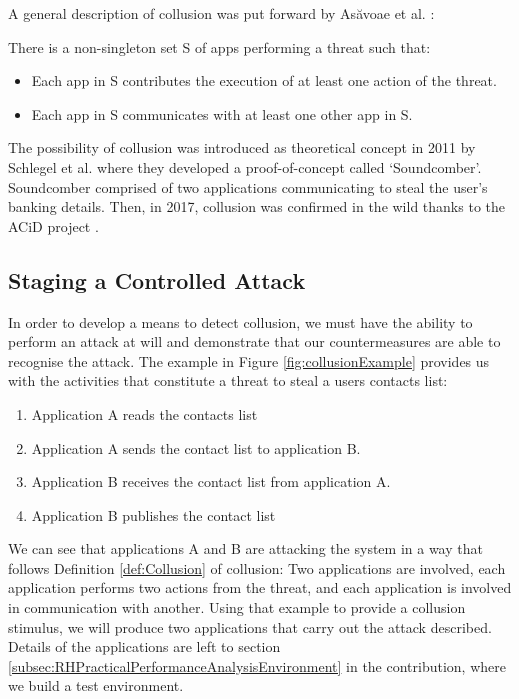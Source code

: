 \noindent
A general description of collusion was put forward by As{\u a}voae et al. \cite{DetectingMaliciousCollusion}:\\

\begin{definition}
\label{def:Collusion}
There is a non-singleton set S of apps performing a threat such that:

\begin{itemize}

\item Each app in S contributes the execution of at least one action of the threat.
\item Each app in S communicates with at least one other app in S. 

\end{itemize}
\end{definition}

\noindent
The possibility of collusion was introduced as theoretical concept in 2011 by Schlegel et al. \cite{Soundcomber} where they developed a proof-of-concept called `Soundcomber'.  Soundcomber comprised of two applications communicating to steal the user's banking details.   Then, in 2017, collusion was confirmed in the wild thanks to the ACiD project \cite{ACiDProject}.

\subsection{Staging a Controlled Attack}
\label{sebsec:PerformingAControlledAttack}

In order to develop a means to detect collusion, we must have the ability to perform an attack at will and demonstrate that our countermeasures are able to recognise the attack.  The example in Figure \ref{fig:collusionExample} provides us with the activities that constitute a threat to steal a users contacts list:

\begin{enumerate}
\item Application A reads the contacts list
\item Application A sends the contact list to application B.
\item Application B receives the contact list from application A.
\item Application B publishes the contact list
\end{enumerate}

We can see that applications A and B are attacking the system in a way that follows Definition \ref{def:Collusion} of collusion:  Two applications are involved, each application performs two actions from the threat, and each application is involved in communication with another.  Using that example to provide a collusion stimulus, we will produce two applications that carry out the attack described.  Details of the applications are left to section \ref{subsec:RHPracticalPerformanceAnalysisEnvironment} in the contribution, where we build a test environment.

